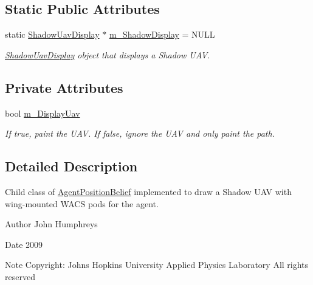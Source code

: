 \subsection*{Static Public Attributes}
\begin{DoxyCompactItemize}
\item 
\hypertarget{class_shadow_agent_position_belief_a66d32cd4fd04cd3245f68f9972d916df}{
static \hyperlink{class_shadow_uav_display}{ShadowUavDisplay} $\ast$ \hyperlink{class_shadow_agent_position_belief_a66d32cd4fd04cd3245f68f9972d916df}{m\_\-ShadowDisplay} = NULL}
\label{class_shadow_agent_position_belief_a66d32cd4fd04cd3245f68f9972d916df}

\begin{DoxyCompactList}\small\item\em \hyperlink{class_shadow_uav_display}{ShadowUavDisplay} object that displays a Shadow UAV. \end{DoxyCompactList}\end{DoxyCompactItemize}
\subsection*{Private Attributes}
\begin{DoxyCompactItemize}
\item 
\hypertarget{class_shadow_agent_position_belief_a7741b792a6e3c4dd7689cd7738ed13fe}{
bool \hyperlink{class_shadow_agent_position_belief_a7741b792a6e3c4dd7689cd7738ed13fe}{m\_\-DisplayUav}}
\label{class_shadow_agent_position_belief_a7741b792a6e3c4dd7689cd7738ed13fe}

\begin{DoxyCompactList}\small\item\em If true, paint the UAV. If false, ignore the UAV and only paint the path. \end{DoxyCompactList}\end{DoxyCompactItemize}


\subsection{Detailed Description}
Child class of \hyperlink{class_agent_position_belief}{AgentPositionBelief} implemented to draw a Shadow UAV with wing-\/mounted WACS pods for the agent. 

\begin{DoxyAuthor}{Author}
John Humphreys 
\end{DoxyAuthor}
\begin{DoxyDate}{Date}
2009 
\end{DoxyDate}
\begin{DoxyNote}{Note}
Copyright: Johns Hopkins University Applied Physics Laboratory All rights reserved 
\end{DoxyNote}


